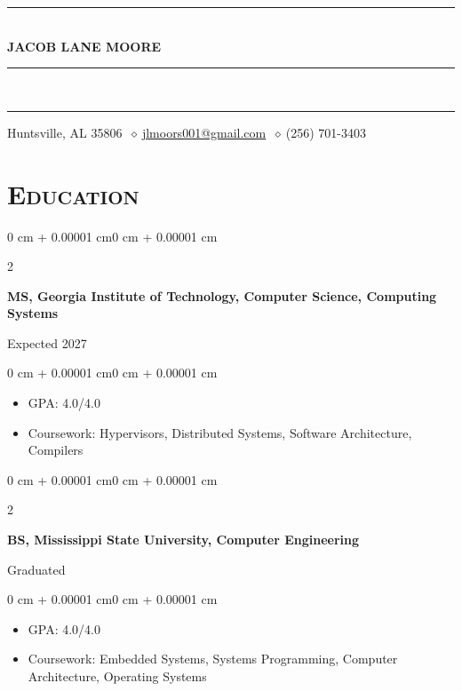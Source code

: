 \documentclass[10pt, letterpaper]{article}
\newenvironment{highlights}{
    \begin{itemize}[
        topsep=0.10 cm,
        parsep=0.10 cm,
        partopsep=0pt,
        itemsep=0pt,
        leftmargin=0.4 cm + 10pt
    ]
}{
    \end{itemize}
}
\newenvironment{onecolentry}{
    \begin{adjustwidth}{0 cm + 0.00001 cm}{0 cm + 0.00001 cm}
}{
    \end{adjustwidth}
}
\newenvironment{twocolentry}[1]{
    \onecolentry
    \def\secondColumn{#1}
    \setcolumnwidth{\fill,4.5cm}
    \begin{paracol}{2}
}{
    \switchcolumn \raggedleft \secondColumn
    \end{paracol}
    \endonecolentry
}
\newcommand{\sep}{\(\ \diamond\ \)}
\begin{document}
\begin{center}

    {\color{primaryColor}\rule{\linewidth}{0.5pt}}\\[0.5em]

    {\fontsize{25pt}{25pt}\selectfont \textbf{\scshape JACOB LANE MOORE}}

    {\color{primaryColor}\rule{\linewidth}{0.5pt}}\\[-0.8em]
    {\color{primaryColor}\rule{\linewidth}{2.5pt}}

    \vspace{0.5em}
    Huntsville, AL 35806 \sep \href{mailto:jlmoors001@gmail.com}{jlmoors001@gmail.com} \sep (256) 701-3403

\end{center}


\section{\scshape Education}

\vspace{0.2 cm}

\begin{twocolentry}{Expected 2027}
    \textbf{MS, Georgia Institute of Technology, Computer Science, Computing Systems}
\end{twocolentry}

\vspace{0.10 cm}
\begin{onecolentry}
\begin{highlights}
    \item GPA: 4.0/4.0
    \item Coursework: Hypervisors, Distributed Systems, Software Architecture, Compilers
\end{highlights}
\end{onecolentry}

\vspace{0.3 cm}

\begin{twocolentry}{Graduated}
    \textbf{BS, Mississippi State University, Computer Engineering}
\end{twocolentry}

\vspace{0.10 cm}
\begin{onecolentry}
\begin{highlights}
    \item GPA: 4.0/4.0
    \item Coursework: Embedded Systems, Systems Programming, Computer Architecture, Operating Systems
\end{highlights}
\end{onecolentry}
\end{document}
